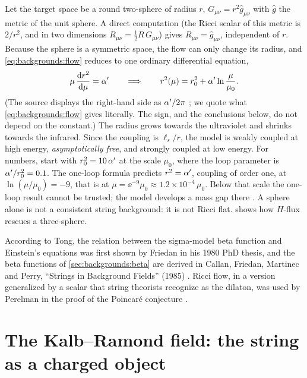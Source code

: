 \begin{example}\label{ex:backgrounds:s2}
Let the target space be a round two-sphere of radius $r$,
$G_{\mu\nu}=r^2\hat g_{\mu\nu}$ with $\hat g$ the metric of the unit sphere. A direct
computation (the Ricci scalar of this metric is $2/r^2$, and in two dimensions
$R_{\mu\nu}=\tfrac12R\,G_{\mu\nu}$) gives $R_{\mu\nu}=\hat g_{\mu\nu}$, independent of $r$.
Because the sphere is a symmetric space, the flow can only change its radius, and
\eqref{eq:backgrounds:flow} reduces to one ordinary differential equation,
\begin{equation}\label{eq:backgrounds:s2}
  \mu\,\frac{\mathrm{d} r^2}{\mathrm{d}\mu}=\alpha'
  \qquad\Longrightarrow\qquad
  r^2(\mu)=r_0^2+\alpha'\ln\frac{\mu}{\mu_0}.
\end{equation}
(The source displays the right-hand side as $\alpha'/2\pi$ ;
we quote what \eqref{eq:backgrounds:flow} gives literally. The sign, and the conclusions
below, do not depend on the constant.) The radius grows towards the ultraviolet and shrinks
towards the infrared. Since the coupling is $\ell_s/r$, the model is weakly coupled at high
energy, \emph{asymptotically free}, and strongly coupled at low energy. For numbers, start
with $r_0^2=10\,\alpha'$ at the scale $\mu_0$, where the loop parameter is $\alpha'/r_0^2=0.1$. The
one-loop formula predicts $r^2=\alpha'$, coupling of order one, at
$\ln(\mu/\mu_0)=-9$, that is at $\mu=\ee^{-9}\mu_0\approx1.2\times10^{-4}\,\mu_0$. Below
that scale the one-loop result cannot be trusted; the model develops a mass gap there
. A sphere alone is not a consistent string background:
it is not Ricci flat.  shows how $H$-flux rescues a three-sphere.
\end{example}

\begin{historybox}
According to Tong, the relation between the sigma-model beta function and Einstein's
equations was first shown by Friedan in his 1980 PhD thesis, and the beta functions of
\cref{sec:backgrounds:beta} are derived in Callan, Friedan, Martinec and Perry, ``Strings in
Background Fields'' (1985) . Ricci flow, in a version generalized by a scalar that string theorists
recognize as the dilaton, was used by Perelman in the proof of the Poincar\'e conjecture
.
\end{historybox}

\section{The Kalb--Ramond field: the string as a charged object}\label{sec:backgrounds:B}

